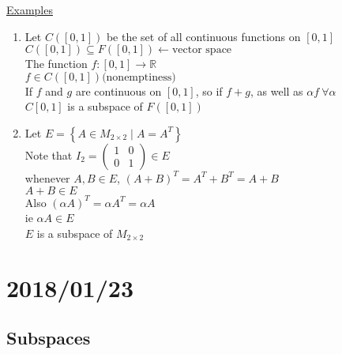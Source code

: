 \documentclass[12pt]{article}
\newcommand\mm[1]{\begin{pmatrix}#1\end{pmatrix}}
\newcommand{\real}[0]{\mathbb{R}}
\newenvironment{examples}{\underline{Examples}\begin{enumerate}}{\end{enumerate}}
\newcommand{\bb}[1]{\left\{#1\right\}}
\begin{document}
\begin{examples}
	\item Let $C([0, 1])$ be the set of all continuous functions on $[0, 1]$ \\
	$C([0, 1]) \subseteq F([0, 1])  \leftarrow \text{vector space}$ \\
	The function $f: [0, 1] \rightarrow \real$ \\
	$f \in C([0, 1]) \text{(nonemptiness)}$ \\
	If $f$ and $g$ are continuous on $[0, 1]$, so if $f + g$, as well as $\alpha f \ \forall \alpha$ \\
	$C[0, 1]$ is a subspace of $F([0, 1])$
	
	\item Let $E = \bb{A \in M_{2 \times 2} \mid A = A^T}$ \\
	Note that $I_2 = \mm{1 & 0 \\ 0 & 1} \in E$ \\
	whenever $A, B \in E$, $(A + B)^T = A^T + B^T = A + B$ \\
	$A + B \in E$ \\
	Also $(\alpha A)^T = \alpha A^T = \alpha A$ \\
	ie $\alpha A \in E$ \\
	$E$ is a subspace of $M_{2 \times 2}$
\end{examples}

\section{2018/01/23}

\subsection{Subspaces}
\end{document}
